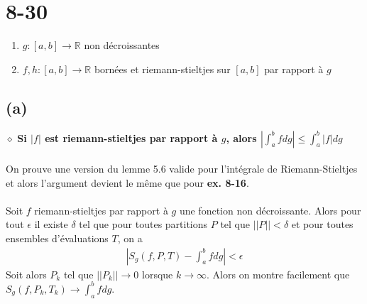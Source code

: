 \documentclass[a4paper,10pt]{article}
\begin{document}
\section*{8-30}
\begin{enumerate}
 \item $g : [a,b] \rightarrow \mathbb{R}$ non décroissantes
 \item $f,h : [a,b] \rightarrow \mathbb{R}$ bornées et riemann-stieltjes sur $[a,b]$ par rapport à $g$
\end{enumerate}
\subsection*{(a)}
$\diamond$ \textbf{Si $|f|$ est riemann-stieltjes par rapport à $g$, alors $\left|\int_a^b f dg \right| \leq \int_a^b |f| dg$}
\\
\\
On prouve une version du lemme 5.6 valide pour l'intégrale de Riemann-Stieltjes et alors l'argument devient le même que pour 
\textbf{ex. 8-16}.
\\
\\
Soit $f$ riemann-stieltjes par rapport à $g$ une fonction non décroissante. Alors pour tout $\epsilon$ il existe $\delta$ tel que 
pour toutes partitions $P$ tel que $||P|| < \delta$ et pour toutes ensembles d'évaluations $T$, on a 
\begin{align*}
 \left|S_g(f,P,T) - \int_a^b f dg\right| < \epsilon
\end{align*}
Soit alors $P_k$ tel que $||P_k|| \rightarrow 0$ lorsque $k \rightarrow \infty$. Alors on montre facilement que $S_g(f,P_k,T_k) \rightarrow \int_a^b f dg$.
\end{document}
